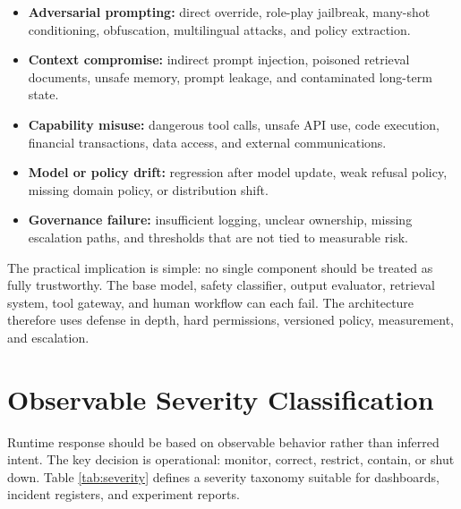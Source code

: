 \documentclass[11pt]{article}
\begin{document}
\begin{itemize}
  \item \textbf{Adversarial prompting:} direct override, role-play jailbreak, many-shot conditioning, obfuscation, multilingual attacks, and policy extraction.
  \item \textbf{Context compromise:} indirect prompt injection, poisoned retrieval documents, unsafe memory, prompt leakage, and contaminated long-term state.
  \item \textbf{Capability misuse:} dangerous tool calls, unsafe API use, code execution, financial transactions, data access, and external communications.
  \item \textbf{Model or policy drift:} regression after model update, weak refusal policy, missing domain policy, or distribution shift.
  \item \textbf{Governance failure:} insufficient logging, unclear ownership, missing escalation paths, and thresholds that are not tied to measurable risk.
\end{itemize}

The practical implication is simple: no single component should be treated as fully trustworthy. The base model, safety classifier, output evaluator, retrieval system, tool gateway, and human workflow can each fail. The architecture therefore uses defense in depth, hard permissions, versioned policy, measurement, and escalation.

\section{Observable Severity Classification}

Runtime response should be based on observable behavior rather than inferred intent. The key decision is operational: monitor, correct, restrict, contain, or shut down. Table \ref{tab:severity} defines a severity taxonomy suitable for dashboards, incident registers, and experiment reports.
\end{document}
